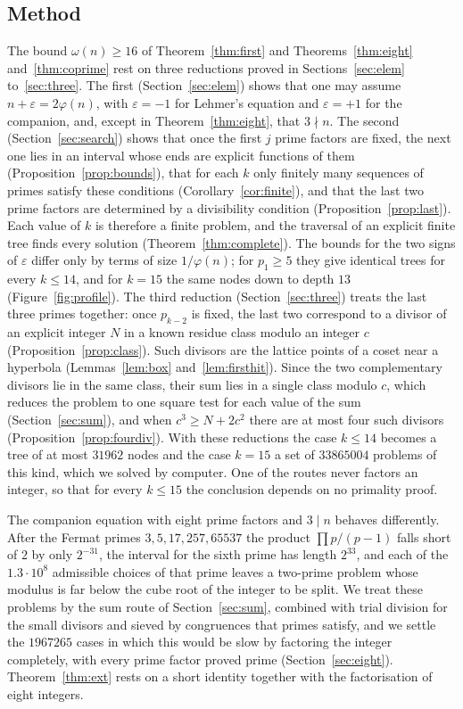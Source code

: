 \documentclass[screen,reqno]{aomart}
\numberwithin{equation}{section}
\theoremstyle{plain}
\theoremstyle{definition}
\theoremstyle{remark}
\begin{document}
\subsection{Method}
The bound $\omega(n)\ge16$ of Theorem~\ref{thm:first} and
Theorems~\ref{thm:eight} and~\ref{thm:coprime} rest on three
reductions proved in Sections~\ref{sec:elem} to~\ref{sec:three}. The
first (Section~\ref{sec:elem}) shows that one may assume
$n+\varepsilon=2\varphi(n)$, with $\varepsilon=-1$ for Lehmer's
equation and $\varepsilon=+1$ for the companion, and, except in
Theorem~\ref{thm:eight}, that $3\nmid n$. The second
(Section~\ref{sec:search}) shows that once the first $j$ prime factors
are fixed, the next one lies in an interval whose ends are explicit
functions of them (Proposition~\ref{prop:bounds}), that for each $k$
only finitely many sequences of primes satisfy these conditions
(Corollary~\ref{cor:finite}), and that the last two prime factors are
determined by a divisibility condition (Proposition~\ref{prop:last}).
Each value of $k$ is therefore a finite problem, and the traversal of
an explicit finite tree finds every solution
(Theorem~\ref{thm:complete}). The bounds for the two signs of
$\varepsilon$ differ only by terms of size $1/\varphi(n)$; for
$p_1\ge5$ they give identical trees for every $k\le14$, and for $k=15$
the same nodes down to depth $13$ (Figure~\ref{fig:profile}). The
third reduction (Section~\ref{sec:three}) treats the last three primes
together: once $p_{k-2}$ is fixed, the last two correspond to a divisor
of an explicit integer $N$ in a known residue class modulo an integer
$c$ (Proposition~\ref{prop:class}). Such divisors are the lattice
points of a coset near a hyperbola (Lemmas~\ref{lem:box}
and~\ref{lem:firsthit}). Since the two complementary divisors lie in
the same class, their sum lies in a single class modulo $c$, which
reduces the problem to one square test for each value of the sum
(Section~\ref{sec:sum}), and when $c^3\ge N+2c^2$ there are at most
four such divisors (Proposition~\ref{prop:fourdiv}). With these
reductions the case $k\le14$ becomes a tree of at most $31962$ nodes
and the case $k=15$ a set of $33865004$ problems of this kind, which
we solved by computer. One of the routes never factors an integer, so
that for every $k\le15$ the conclusion depends on no primality proof.

The companion equation with eight prime factors and $3\mid n$ behaves
differently. After the Fermat primes $3,5,17,257,65537$ the product
$\prod p/(p-1)$ falls short of $2$ by only $2^{-31}$, the interval for
the sixth prime has length $2^{33}$, and each of the
$1.3\cdot10^8$ admissible choices of that prime leaves a two-prime
problem whose modulus is far below the cube root of the integer to be
split. We treat these problems by the sum route of
Section~\ref{sec:sum}, combined with trial division for the small
divisors and sieved by congruences that primes satisfy, and we settle
the $1967265$ cases in which this would be slow by factoring the integer
completely, with every prime factor proved prime
(Section~\ref{sec:eight}). Theorem~\ref{thm:ext} rests on a short
identity together with the factorisation of eight integers.
\end{document}
